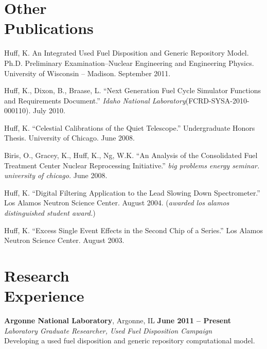 \documentclass[margin,line]{resume}
\begin{document}
\begin{resume}
    \section{\mysidestyle Other\\Publications}
    \begin{bibenum}
      \item Huff, K. An Integrated Used Fuel Disposition and Generic Repository Model. 
        Ph.D. Preliminary Examination--Nuclear Engineering and Engineering 
        Physics. University of Wisconsin -- Madison.  September 2011. 
      \item Huff, K., Dixon, B., Braase, L. ``Next Generation Fuel Cycle Simulator Functions and Requirements Document.'' 
        \emph{Idaho National Laboratory}(FCRD-SYSA-2010-000110). July 2010. 
      \item Huff, K. ``Celestial Calibrations of the Quiet Telescope.''
        Undergraduate Honors Thesis. University of Chicago. June 2008.
      \item Biris, O., Gracey, K., Huff, K., Ng, W.K.  
        ``An Analysis of the Consolidated Fuel Treatment Center Nuclear 
        Reprocessing Initiative.''
        \emph{big problems energy seminar. university of chicago.} June 2008.
      \item Huff, K. ``Digital Filtering Application to the Lead Slowing Down 
        Spectrometer.'' Los Alamos Neutron Science Center. August 2004.  %
        (\emph{awarded los alamos distinguished student award.}) 
      \item Huff, K. ``Excess Single Event Effects in the Second Chip of a Series.'' 
        Los Alamos Neutron Science Center. August 2003. 
    \end{bibenum}

    \section{\mysidestyle Research\\Experience}
    \textbf{Argonne National Laboratory}, Argonne, IL \hfill \textbf{June 2011 -- Present}\\
		\textsl{Laboratory Graduate Researcher, Used Fuel Disposition Campaign}\\ 
		Developing a used fuel disposition and generic repository computational model.


\end{resume}
\end{document}

